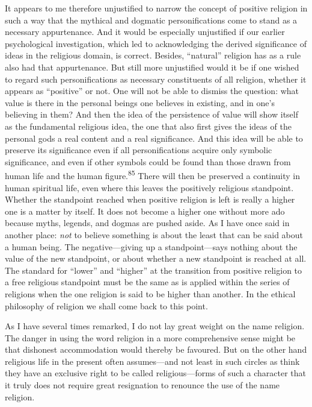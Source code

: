 \documentclass[12pt,a4paper]{book}
\newcommand{\opage}[1]{\marginnote{\footnotesize\textit{[#1]}}}
\begin{document}
It appears to me therefore unjustified to narrow the concept of positive religion in such a way that
the mythical and dogmatic personifications come to stand as a necessary appurtenance. And it would be
especially unjustified if our earlier psychological investigation, which led to acknowledging the
derived significance of ideas in the religious domain, is correct. Besides, ``natural'' religion has as
a rule also had that appurtenance. But still more unjustified would it be if one wished to regard such
personifications as necessary constituents of all religion, whether it appears as ``positive'' or not.
One will not be able to dismiss the question: what value is there in the personal beings one believes
in existing, and in one's believing in them? And then the idea of the persistence of value will show
itself as the fundamental religious idea, the one that also first gives the ideas of the personal gods
a real content and a real significance. And this idea will be able to preserve its significance even if
all personifications acquire only symbolic significance, and even if other symbols could be found than
those drawn from human life and the human figure.\textsuperscript{85} There will then be preserved a
continuity in human spiritual life, even where this leaves the 
\opage{173}positively religious standpoint. Whether
the standpoint reached when positive religion is left is really a higher one is a matter by itself. It
does not become a higher one without more ado because myths, legends, and dogmas are pushed aside. As I
have once said in another place: \emph{not} to believe something is about the least that can be said
about a human being. The negative---giving up a standpoint---says nothing about the value of the new
standpoint, or about whether a new standpoint is reached at all. The standard for ``lower'' and
``higher'' at the transition from positive religion to a free religious standpoint must be the same as
is applied within the series of religions when the one religion is said to be higher than another. In
the ethical philosophy of religion we shall come back to this point.

As I have several times remarked, I do not lay great weight on the name religion. The danger in using
the word religion in a more comprehensive sense might be that dishonest accommodation would thereby be
favoured. But on the other hand religious life in the present often assumes---and not least in such
circles as think they have an exclusive right to be called religious---forms of such a character that
it truly does not require great resignation to renounce the use of the name religion.
\end{document}
